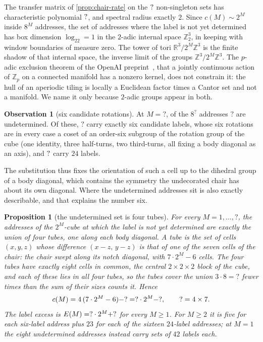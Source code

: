 \documentclass[11pt,a4paper]{article}
\newcommand{\SSChCConst}{?}\newcommand{\SSChChecks}{?}
\newcommand{\SSChEConst}{?}\newcommand{\SSChKuhnAut}{?}
\newcommand{\SSChSix}{?}\newcommand{\SSChTermsChecked}{?}
\newcommand{\SSChUndet}{?}\newcommand{\SSChUndetM}{?}
\newcommand{\SSChTubeM}{?}\newcommand{\SSChTubeOverlap}{?}
\newcommand{\ZZ}{\mathbb{Z}}
\newcommand{\RR}{\mathbb{R}}
\theoremstyle{plain}
\newtheorem{proposition}{Proposition}
\theoremstyle{definition}
\newtheorem{observation}{Observation}
\begin{document}
The transfer matrix of \cref{prop:chair-rate} on the $?{}$ non-singleton
sets has characteristic polynomial $?$, and spectral radius exactly $2$.
Since $c(M)\sim2^M$ inside $8^M$ addresses, the set of addresses where the label is not
yet determined has box dimension $\log_22=1$ in the $2$-adic internal space $\ZZ_2^3$, in
keeping with window boundaries of measure zero. The tower of tori $\RR^3/2^M\ZZ^3$ is the finite shadow of that
internal space, the inverse limit of the groups $\ZZ^3/2^M\ZZ^3$. The $p$-adic exclusion theorem of the OpenAI preprint~\cite{OAIHS},
that a jointly continuous action of $\ZZ_p$ on a connected manifold has a nonzero kernel, does not constrain it: the hull of an
aperiodic tiling is locally a Euclidean factor times a Cantor set and not a manifold. We name it only because $2$-adic groups appear in both.

\begin{observation}[six candidate rotations]
\label{obs:chair-six}
At $M=\SSChUndetM$, of the $8^{\SSChUndetM}$ addresses $\SSChUndet{}$ are undetermined.
Of these, $\SSChSix{}$ carry exactly six candidate labels, whose six rotations are in
every case a coset of an order-six subgroup of the rotation group of the cube (one
identity, three half-turns, two third-turns, all fixing a body diagonal as an axis), and
$?{}$ carry $24$ labels.
\end{observation}

The substitution thus fixes the orientation of such a cell up to the dihedral group of a
body diagonal, which contains the symmetry the undecorated chair has about its own
diagonal. Where the undetermined addresses sit is also exactly describable, and that
explains the number six.

\begin{proposition}[the undetermined set is four tubes]
\label{prop:chair-tubes}
For every $M=1,\dots,\SSChTubeM$, the addresses of the $2^M$-cube at which the label is not
yet determined are exactly the union of four \emph{tubes}, one along each body diagonal. A
tube is the set of cells $(x,y,z)$ whose difference $(x-z,\,y-z)$ is that of one of the
seven cells of the chair: the chair swept along its notch diagonal, with $7\cdot2^M-6$
cells. The four tubes have exactly eight cells in common, the central $2\times2\times2$ block
of the cube, and each of these lies in all four tubes, so the tubes cover the union
$3\cdot8=\SSChTubeOverlap$ fewer times than the sum of their sizes counts it. Hence
\[
  c(M)=4\,(7\cdot2^M-6)-\SSChTubeOverlap=\SSChCCoef\cdot2^M-\SSChCConst,
  \qquad \SSChCCoef=4\times7.
\]
The label excess is $E(M)=\SSChECoef\cdot2^M+\SSChEConst$ for every $M\ge1$. For
$M\ge2$ it is five for each six-label address plus $23$ for each of the sixteen $24$-label
addresses; at $M=1$ the eight undetermined addresses instead carry sets of $42$ labels each.
\end{proposition}
\end{document}
